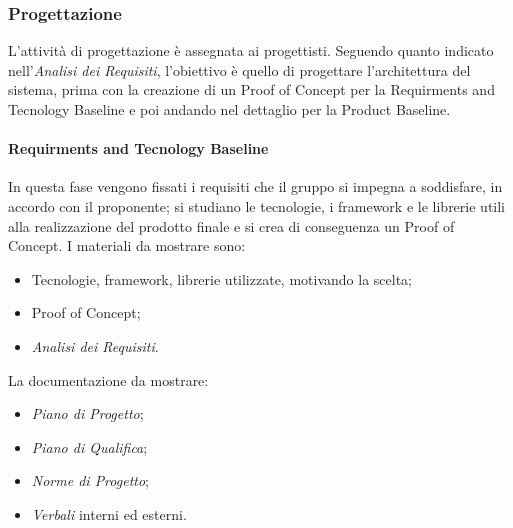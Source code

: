\subsubsection{Progettazione} 
L’attività di progettazione è assegnata ai progettisti. Seguendo quanto indicato 
nell’\textit{Analisi dei Requisiti}, l’obiettivo è quello di progettare l’architettura del sistema, 
prima con la creazione di un Proof of Concept per la Requirments and Tecnology Baseline e poi andando 
nel dettaglio per la Product Baseline.

\paragraph{Requirments and Tecnology Baseline} 
In questa fase vengono fissati i requisiti che il gruppo si impegna a soddisfare, in accordo con il 
proponente; si studiano le tecnologie, i framework e le librerie utili alla realizzazione del 
prodotto finale e si crea di conseguenza un Proof of Concept. I materiali da mostrare sono:
    \begin{itemize}
        \item Tecnologie, framework, librerie utilizzate, motivando la scelta;
        \item Proof of Concept;
        \item \textit{Analisi dei Requisiti}.
    \end{itemize}
La documentazione da mostrare:
    \begin{itemize}
        \item \textit{Piano di Progetto};
        \item \textit{Piano di Qualifica};
        \item \textit{Norme di Progetto};
        \item \textit{Verbali} interni ed esterni.
    \end{itemize}